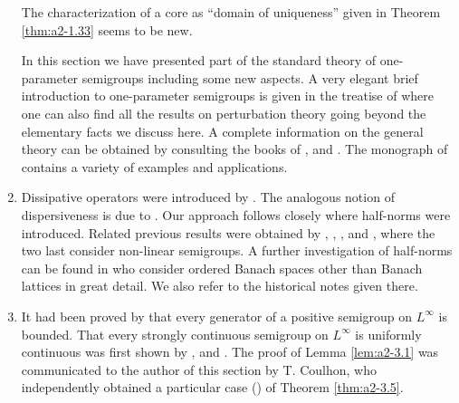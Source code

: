 \begin{enumerate}[label=\emph{Section \arabic*:}, wide, itemsep=1ex]
The characterization of a core as \enquote{domain of uniqueness} given in Theorem \ref{thm:a2-1.33}   seems to be new.

In this section we have presented part of the standard theory of one-parameter semigroups including some new aspects.
A very elegant brief introduction to one-parameter semigroups is given in the treatise of \citet{kato:1966} where one can also find all the results on perturbation theory going beyond the elementary facts we discuss here.
A complete information on the general theory can be obtained by consulting the books of \citet{davies:1980}, \citet{goldstein:1985a} and \citet{pazy:1983}.
The monograph of \citet{goldstein:1985a} contains a variety of examples and applications.

\item
Dissipative operators were introduced by \citet{lumerphillips:1961}.
The analogous notion of dispersiveness is due to \citet{phillips:1962}.
Our approach follows closely \citet{arendtchernoffkato:1982} where half-norms were introduced.
Related previous results were obtained by \citet{calvert:1971a}, \citet{hasegawa:1966}, \citet{sato:1968}, \citet{benilanpicard:1979} and \citet{picard:1972}, where the two last consider non-linear semigroups.
A further investigation of half-norms can be found in \citet{battyrobinson:1984} who consider ordered Banach spaces other than Banach lattices in great detail.
We also refer to the historical notes given there.

\item
It had been proved by \citet{kishimotorobinson:1981} that every generator of a positive semigroup on $L^{\infty}$ is bounded.
That every strongly continuous semigroup on $L^{\infty}$ is uniformly continuous was first shown by \citet{lotz:1982}, \citet{lotz:1984} and \citet{lotz:1985}.
The proof of Lemma \ref{lem:a2-3.1}  was communicated to the author of this section by T. Coulhon, who independently obtained a particular case (\citet{coulhon:1984}) of Theorem \ref{thm:a2-3.5}.

\end{enumerate}

